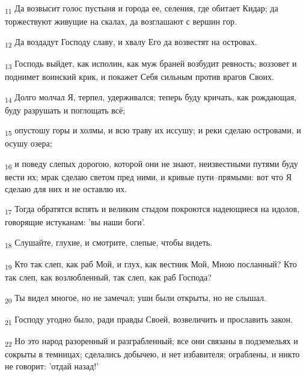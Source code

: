 \begin{tcolorbox}
\textsubscript{11} Да возвысит голос пустыня и города ее, селения, где обитает Кидар; да торжествуют живущие на скалах, да возглашают с вершин гор.
\end{tcolorbox}
\begin{tcolorbox}
\textsubscript{12} Да воздадут Господу славу, и хвалу Его да возвестят на островах.
\end{tcolorbox}
\begin{tcolorbox}
\textsubscript{13} Господь выйдет, как исполин, как муж браней возбудит ревность; воззовет и поднимет воинский крик, и покажет Себя сильным против врагов Своих.
\end{tcolorbox}
\begin{tcolorbox}
\textsubscript{14} Долго молчал Я, терпел, удерживался; теперь буду кричать, как рождающая, буду разрушать и поглощать всё;
\end{tcolorbox}
\begin{tcolorbox}
\textsubscript{15} опустошу горы и холмы, и всю траву их иссушу; и реки сделаю островами, и осушу озера;
\end{tcolorbox}
\begin{tcolorbox}
\textsubscript{16} и поведу слепых дорогою, которой они не знают, неизвестными путями буду вести их; мрак сделаю светом пред ними, и кривые пути--прямыми: вот что Я сделаю для них и не оставлю их.
\end{tcolorbox}
\begin{tcolorbox}
\textsubscript{17} Тогда обратятся вспять и великим стыдом покроются надеющиеся на идолов, говорящие истуканам: 'вы наши боги'.
\end{tcolorbox}
\begin{tcolorbox}
\textsubscript{18} Слушайте, глухие, и смотрите, слепые, чтобы видеть.
\end{tcolorbox}
\begin{tcolorbox}
\textsubscript{19} Кто так слеп, как раб Мой, и глух, как вестник Мой, Мною посланный? Кто так слеп, как возлюбленный, так слеп, как раб Господа?
\end{tcolorbox}
\begin{tcolorbox}
\textsubscript{20} Ты видел многое, но не замечал; уши были открыты, но не слышал.
\end{tcolorbox}
\begin{tcolorbox}
\textsubscript{21} Господу угодно было, ради правды Своей, возвеличить и прославить закон.
\end{tcolorbox}
\begin{tcolorbox}
\textsubscript{22} Но это народ разоренный и разграбленный; все они связаны в подземельях и сокрыты в темницах; сделались добычею, и нет избавителя; ограблены, и никто не говорит: 'отдай назад!'
\end{tcolorbox}
